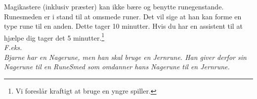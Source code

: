 Magikastere (inklusiv præster) kan ikke bære og benytte runegenstande.\\

Runesmeden er i stand til at omsmede runer. Det vil sige at han kan forme en type rune til en anden. Dette tager 10 minutter. Hvis du har en assistent til at hjælpe dig tager det 5 minutter.\footnote{Vi foreslår kraftigt at bruge en yngre spiller.}\\
\textit{F.eks.\\Bjarne har en Nagerune, men han skal bruge en Jernrune. Han giver derfor sin Nagerune til en RuneSmed som omdanner hans Nagerune til en Jernrune.}\\

